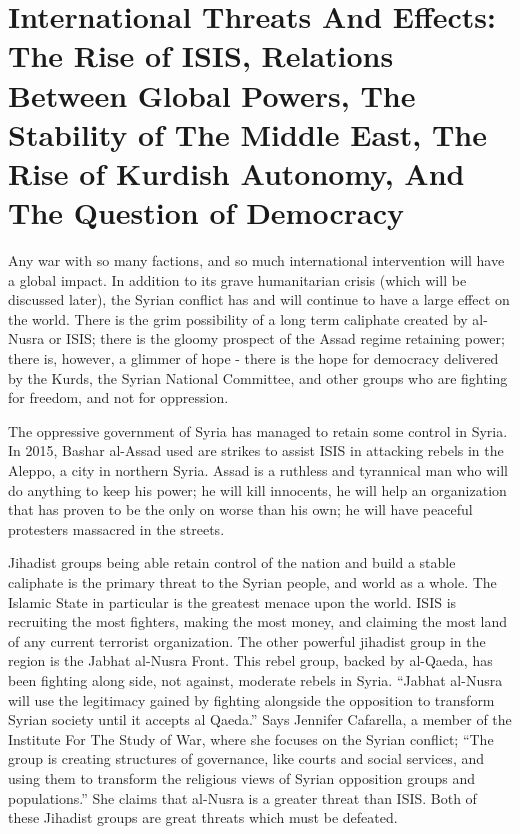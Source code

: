 \documentclass[a4paper,titlepage,12pt]{turabian-researchpaper}
\begin{document}
\section{International Threats And Effects: The Rise of ISIS, Relations Between
	Global Powers, The Stability of The Middle East, The Rise of Kurdish
	Autonomy, And The Question of Democracy}

Any war with so many factions, and so much international intervention will have
a global impact. In addition to its grave humanitarian crisis (which will be
discussed later), the Syrian conflict has and will continue to have a large
effect on the world. There is the grim possibility of a long term caliphate
created by al-Nusra or ISIS; there is the gloomy prospect of the Assad regime
retaining power; there is, however, a glimmer of hope - there is the hope for
democracy delivered by the Kurds, the Syrian National Committee, and other
groups who are fighting for freedom, and not for oppression.

The oppressive government of Syria has managed to retain some control in
Syria. In 2015, Bashar al-Assad used are strikes to assist ISIS in attacking
rebels in the Aleppo, a city in northern Syria. \autocite{assad} Assad is
a ruthless and tyrannical man who will do anything to keep his power; he will
kill innocents, he will help an organization that has proven to be the only on
worse than his own; he will have peaceful protesters massacred in the streets.

Jihadist groups
being able retain control of the nation and build a stable
caliphate is the primary threat to the Syrian people, and world as a whole.
The Islamic State in particular is the greatest menace upon the world. ISIS is
recruiting the most fighters, making the most money, and claiming the most land
of any current terrorist organization. \autocite{isis} The other powerful
jihadist group in the region is the Jabhat al-Nusra Front. This rebel group,
backed by al-Qaeda, has been fighting along side, not against, moderate rebels
in Syria. ``Jabhat al-Nusra will use the legitimacy gained by fighting
alongside the opposition to transform Syrian society until it accepts al
Qaeda.'' Says Jennifer Cafarella, a member of the Institute For The Study of
War, where she focuses on the Syrian conflict; ``The group is creating
structures of governance, like courts and social services, and using them to
transform the religious views of Syrian opposition groups and populations.''
She claims that al-Nusra is a greater threat than ISIS. \autocite{nusra} Both
of these Jihadist groups are great threats which must be defeated.
\end{document}
